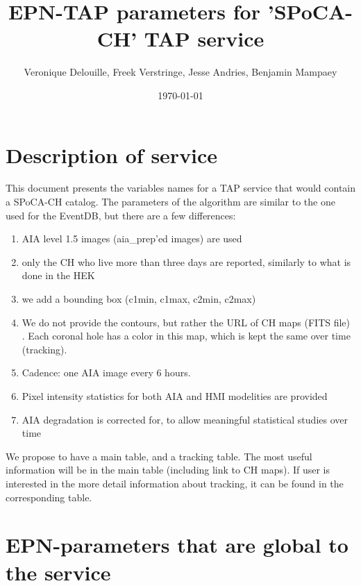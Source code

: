 \documentclass{article}
\title{EPN-TAP parameters for 'SPoCA-CH' TAP service}
\author{Veronique Delouille, Freek Verstringe, Jesse Andries, Benjamin Mampaey}
\date{\today}
\begin{document}
\maketitle
\section{Description of service}
This document presents the variables names for a TAP service that would contain a SPoCA-CH catalog. The parameters of the algorithm are similar to the one used for the EventDB, but there are a few differences:

\begin{enumerate}
\item AIA level 1.5 images (aia\_prep'ed images) are used
\item only the CH who live more than three days are reported, similarly to what is done in the HEK
\item we add a bounding box (c1min, c1max, c2min, c2max)
\item We do not provide the contours, but rather the  URL of  CH maps (FITS file) . Each coronal hole has a color in this map, which is kept the same over time (tracking).
\item Cadence: one AIA image every 6 hours.
\item Pixel intensity statistics for both AIA and HMI  modelities are provided
\item AIA degradation is corrected for, to allow meaningful statistical studies over time
\end{enumerate}

We propose to have a main table, and a tracking table. The most useful information will be in the main table (including link to CH maps). If user is interested in the more detail information about tracking, it can be found in the corresponding table.

\newpage
\section{EPN-parameters that are global to the service}
\end{document}
